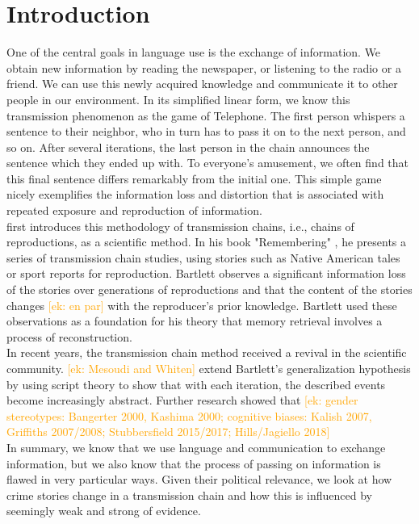 \documentclass[10pt,letterpaper]{article}
\newcommand{\ek}[1]{\textcolor{Orange}{[ek: #1]}}
\begin{document}
\section{Introduction}
One of the central goals in language use is the exchange of information. We obtain new information by reading the newspaper, or listening to the radio or a friend. We can use this newly acquired knowledge and communicate it to other people in our environment. In its simplified linear form, we know this transmission phenomenon as the game of Telephone. The first person whispers a sentence to their neighbor, who in turn has to pass it on to the next person, and so on. After several iterations, the last person in the chain announces the sentence which they ended up with. To everyone's amusement, we often find that this final sentence differs remarkably from the initial one. This simple game nicely exemplifies the information loss and distortion that is associated with repeated exposure and reproduction of information.\\
\cite{Bartlett:1932} first introduces this methodology of transmission chains, i.e., chains of reproductions, as a scientific method. In his book "Remembering" \cite{Bartlett:1932}, he presents a series of transmission chain studies, using stories such as Native American tales or sport reports for reproduction. Bartlett observes a significant information loss of the stories over generations of reproductions and that the content of the stories changes \ek{en par} with the reproducer's prior knowledge. Bartlett used these observations as a foundation for his theory that memory retrieval involves a process of reconstruction. \\
In recent years, the transmission chain method received a revival in the scientific community. \ek{Mesoudi and Whiten} extend Bartlett's generalization hypothesis by using script theory to show that with each iteration, the described events become increasingly abstract. Further research showed that \ek{gender stereotypes: Bangerter 2000, Kashima 2000; cognitive biases: Kalish 2007, Griffiths 2007/2008; Stubbersfield 2015/2017; Hills/Jagiello 2018}\\
In summary, we know that we use language and communication to exchange information, but we also know that the process of passing on information is flawed in very particular ways. Given their political relevance, we look at how crime stories change in a transmission chain and how this is influenced by seemingly weak and strong of evidence.\\
\end{document}
